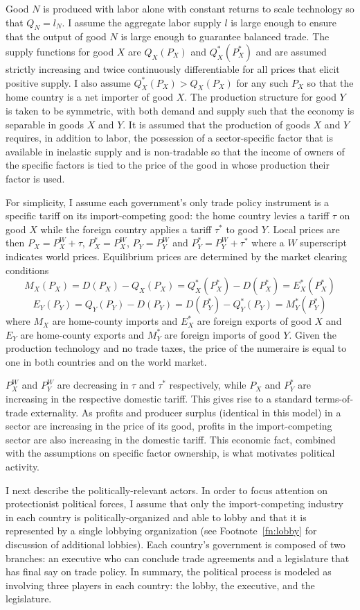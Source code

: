 \documentclass[10pt]{article}
\begin{document}
Good $N$ is produced with labor alone with constant returns to scale technology so that $Q_N = l_N$. I assume the aggregate labor supply $l$ is large enough to ensure that the output of good $N$ is large enough to guarantee balanced trade. The supply functions for good $X$ are $Q_X(P_X)$ and $Q_X^*(P_X^*)$ and are assumed strictly increasing and twice continuously differentiable for all prices that elicit positive supply. I also assume $Q_X^*(P_X) > Q_X(P_X)$ for any such $P_X$ so that the home country is a net importer of good $X$. The production structure for good $Y$ is taken to be symmetric, with both demand and supply such that the economy is separable in goods $X$ and $Y$. It is assumed that the production of goods $X$ and $Y$ requires, in addition to labor, the possession of a sector-specific factor that is available in inelastic supply and is non-tradable so that the income of owners of the specific factors is tied to the price of the good in whose production their factor is used. 

For simplicity, I assume each government's only trade policy instrument is a specific tariff on its import-competing good: the home country levies a tariff $\tau$ on good $X$ while the foreign country applies a tariff $\tau^*$ to good $Y$. Local prices are then $P_X = P_X^W + \tau$, $P_X^* = P_X^W$, $P_Y = P_Y^W$ and $P_Y^* = P_Y^W + \tau^*$ where a $W$ superscript indicates world prices. Equilibrium prices are determined by the market clearing conditions
$$M_X(P_X)= D(P_X)-Q_X(P_X) = Q_X^*(P_X^*) - D(P_X^*) = E_X^*(P_X^*)$$
$$E_Y(P_Y)=Q_Y(P_Y)-D(P_Y) = D(P_Y^*)-Q_Y^*(P_Y) = M_Y^*(P_Y^*)$$
where $M_X$ are home-county imports and $E_X^*$ are foreign exports of good $X$ and $E_Y$ are home-county exports and $M_Y^*$ are foreign imports of good $Y$. Given the production technology and no trade taxes, the price of the numeraire is equal to one in both countries and on the world market.

$P_X^W$ and $P_Y^W$ are decreasing in $\tau$ and $\tau^*$ respectively, while $P_X$ and $P_Y^*$ are increasing in the respective domestic tariff. This gives rise to a standard terms-of-trade externality. As profits and producer surplus (identical in this model) in a sector are increasing in the price of its good, profits in the import-competing sector are also increasing in the domestic tariff. This economic fact, combined with the assumptions on specific factor ownership, is what motivates political activity.

I next describe the politically-relevant actors. In order to focus attention on protectionist political forces, I assume that only the import-competing industry in each country is politically-organized and able to lobby and that it is represented by a single lobbying organization (see Footnote~\ref{fn:lobby} for discussion of additional lobbies). Each country's government is composed of two branches: an executive who can conclude trade agreements and a legislature that has final say on trade policy. In summary, the political process is modeled as involving three players in each country: the lobby, the executive, and the legislature.
\end{document}
